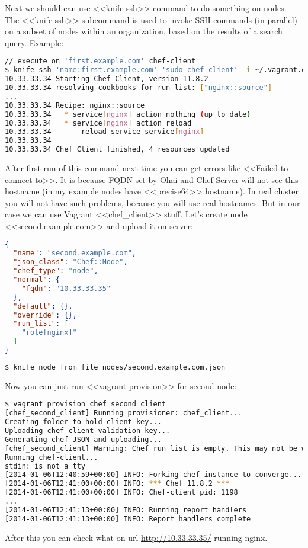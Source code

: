 Next we should can use <<knife ssh>> command to do something on nodes. The <<knife ssh>> subcommand is used to invoke SSH commands (in parallel) on a subset of nodes within an organization, based on the results of a search query. Example:

\begin{lstlisting}[language=Bash,label=lst:my-serer-cloud-role5]
// execute on 'first.example.com' chef-client
$ knife ssh 'name:first.example.com' 'sudo chef-client' -i ~/.vagrant.d/insecure_private_key -x vagrant
10.33.33.34 Starting Chef Client, version 11.8.2
10.33.33.34 resolving cookbooks for run list: ["nginx::source"]
...
10.33.33.34 Recipe: nginx::source
10.33.33.34   * service[nginx] action nothing (up to date)
10.33.33.34   * service[nginx] action reload
10.33.33.34     - reload service service[nginx]
10.33.33.34
10.33.33.34 Chef Client finished, 4 resources updated
\end{lstlisting}

After first run of this command next time you can get errors like <<Failed to connect to>>. It is because FQDN set by Ohai and Chef Server will not see this hostname (in my example nodes have <<precise64>> hostname). In real cluster you will not have such problems, because you will use real hostnames. But in our case we can use Vagrant <<chef\_client>> stuff. Let's create node <<second.example.com>> and upload it on server:

\begin{lstlisting}[language=JSON,label=lst:my-serer-cloud-role6,title=my-server-cloud/nodes/second.example.com.json]
{
  "name": "second.example.com",
  "json_class": "Chef::Node",
  "chef_type": "node",
  "normal": {
    "fqdn": "10.33.33.35"
  },
  "default": {},
  "override": {},
  "run_list": [
    "role[nginx]"
  ]
}
\end{lstlisting}

\begin{lstlisting}[language=Bash,label=lst:my-serer-cloud-role7]
$ knife node from file nodes/second.example.com.json
\end{lstlisting}

Now you can just run <<vagrant provision>> for second node:

\begin{lstlisting}[language=Bash,label=lst:my-serer-cloud-role8]
$ vagrant provision chef_second_client
[chef_second_client] Running provisioner: chef_client...
Creating folder to hold client key...
Uploading chef client validation key...
Generating chef JSON and uploading...
[chef_second_client] Warning: Chef run list is empty. This may not be what you want.
Running chef-client...
stdin: is not a tty
[2014-01-06T12:40:59+00:00] INFO: Forking chef instance to converge...
[2014-01-06T12:41:00+00:00] INFO: *** Chef 11.8.2 ***
[2014-01-06T12:41:00+00:00] INFO: Chef-client pid: 1198
...
[2014-01-06T12:41:13+00:00] INFO: Running report handlers
[2014-01-06T12:41:13+00:00] INFO: Report handlers complete
\end{lstlisting}

After this you can check what on url \href{http://10.33.33.35/}{http://10.33.33.35/} running nginx.